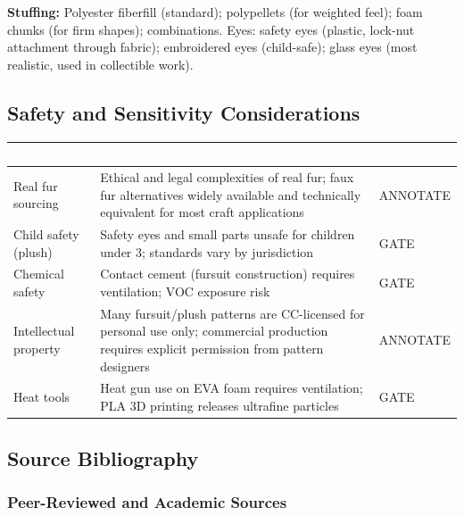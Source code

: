 \documentclass[11pt,letterpaper]{article}
\newcommand{\tableheader}[1]{\textbf{\sffamily\textcolor{white}{#1}}}
\begin{document}
\textbf{Stuffing:} Polyester fiberfill (standard); polypellets (for weighted feel); foam chunks (for firm shapes); combinations. Eyes: safety eyes (plastic, lock-nut attachment through fabric); embroidered eyes (child-safe); glass eyes (most realistic, used in collectible work).

\subsection{Safety and Sensitivity Considerations}

\begin{center}
\begin{tabularx}{\textwidth}{L{4cm}XC{2.5cm}}
\toprule
{}
\tableheader{Area} & \tableheader{Consideration} & \tableheader{Type} \\
\midrule
Real fur sourcing & Ethical and legal complexities of real fur; faux fur alternatives widely available and technically equivalent for most craft applications & ANNOTATE \\
Child safety (plush) & Safety eyes and small parts unsafe for children under 3; standards vary by jurisdiction & GATE \\
Chemical safety & Contact cement (fursuit construction) requires ventilation; VOC exposure risk & GATE \\
Intellectual property & Many fursuit/plush patterns are CC-licensed for personal use only; commercial production requires explicit permission from pattern designers & ANNOTATE \\
Heat tools & Heat gun use on EVA foam requires ventilation; PLA 3D printing releases ultrafine particles & GATE \\
\bottomrule
\end{tabularx}
\end{center}

\subsection{Source Bibliography}

\subsubsection{Peer-Reviewed and Academic Sources}
\end{document}
